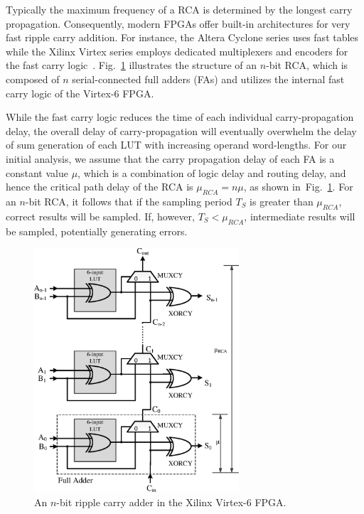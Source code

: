 \documentclass[prodmode,acmtrets]{acmsmall} %
\begin{document}
Typically the maximum frequency of a RCA is determined by the longest carry propagation. Consequently, modern FPGAs offer built-in architectures for very fast ripple carry addition. For instance, the Altera Cyclone series uses fast tables~\cite{AlteraCyclone} while the Xilinx Virtex series employs dedicated multiplexers and encoders for the fast carry logic~\cite{Virtex6}. Fig.~\ref{FPGA adder} illustrates the structure of an $n$-bit RCA, which is composed of $n$ serial-connected full adders (FAs) and utilizes the internal fast carry logic of the Virtex-6 FPGA.

While the fast carry logic reduces the time of each individual carry-propagation delay, the overall delay of carry-propagation will eventually overwhelm the delay of sum generation of each LUT with increasing operand word-lengths. For our initial analysis, we assume that the carry propagation delay of each FA is a constant value $\mu$, which is a combination of logic delay and routing delay, and hence the critical path delay of the RCA is $\mu_{RCA}=n\mu$, as shown in~Fig.~\ref{FPGA adder}. For an $n$-bit RCA, it follows that if the sampling period $T_S$ is greater than $\mu_{RCA}$, correct results will be sampled. If, however, $T_S<\mu_{RCA}$, intermediate results will be sampled, potentially generating errors.

\begin{figure}[t]
  \centering
  \includegraphics[width=3in]{./Figures/FastCarryLogic3.eps}
  \caption{An $n$-bit ripple carry adder in the Xilinx Virtex-6 FPGA.}
  \label{FPGA adder}
\end{figure}
\end{document}
